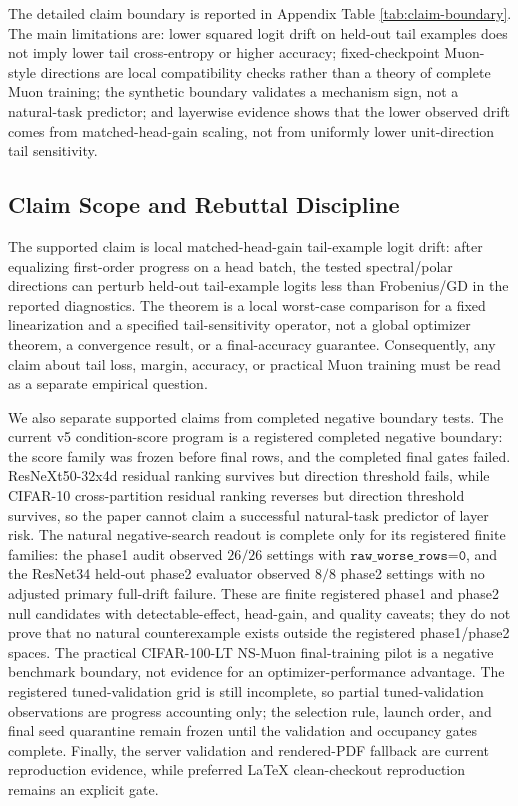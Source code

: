 \documentclass{article}
\theoremstyle{definition}
\begin{document}
The detailed claim boundary is reported in Appendix Table \ref{tab:claim-boundary}. The main limitations are: lower squared logit drift on held-out tail examples does not imply lower tail cross-entropy or higher accuracy; fixed-checkpoint Muon-style directions are local compatibility checks rather than a theory of complete Muon training; the synthetic boundary validates a mechanism sign, not a natural-task predictor; and layerwise evidence shows that the lower observed drift comes from matched-head-gain scaling, not from uniformly lower unit-direction tail sensitivity.

\subsection{Claim Scope and Rebuttal Discipline}

The supported claim is local matched-head-gain tail-example logit drift: after equalizing first-order progress on a head batch, the tested spectral/polar directions can perturb held-out tail-example logits less than Frobenius/GD in the reported diagnostics. The theorem is a local worst-case comparison for a fixed linearization and a specified tail-sensitivity operator, not a global optimizer theorem, a convergence result, or a final-accuracy guarantee. Consequently, any claim about tail loss, margin, accuracy, or practical Muon training must be read as a separate empirical question.

We also separate supported claims from completed negative boundary tests. The current v5 condition-score program is a registered completed negative boundary: the score family was frozen before final rows, and the completed final gates failed. ResNeXt50-32x4d residual ranking survives but direction threshold fails, while CIFAR-10 cross-partition residual ranking reverses but direction threshold survives, so the paper cannot claim a successful natural-task predictor of layer risk. The natural negative-search readout is complete only for its registered finite families: the phase1 audit observed \(26/26\) settings with \(\texttt{raw\_worse\_rows=0}\), and the ResNet34 held-out phase2 evaluator observed \(8/8\) phase2 settings with no adjusted primary full-drift failure. These are finite registered phase1 and phase2 null candidates with detectable-effect, head-gain, and quality caveats; they do not prove that no natural counterexample exists outside the registered phase1/phase2 spaces. The practical CIFAR-100-LT NS-Muon final-training pilot is a negative benchmark boundary, not evidence for an optimizer-performance advantage. The registered tuned-validation grid is still incomplete, so partial tuned-validation observations are progress accounting only; the selection rule, launch order, and final seed quarantine remain frozen until the validation and occupancy gates complete. Finally, the server validation and rendered-PDF fallback are current reproduction evidence, while preferred LaTeX clean-checkout reproduction remains an explicit gate.
\end{document}
